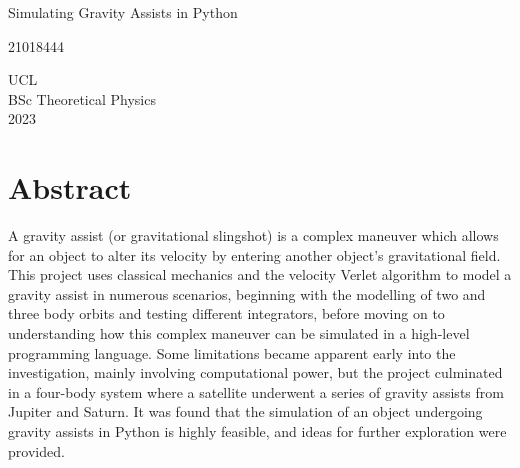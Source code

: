 \documentclass[11pt, english]{report}
\begin{document}
\begin{titlepage}

   \begin{center}
       \vspace*{3cm}
       {Simulating Gravity Assists in Python}
 
       \vspace{4cm}
 
       {21018444}\\
       
       \vspace*{10cm}
      
       
      UCL\\
      
      BSc Theoretical Physics\\
      
      2023
      
 
   \end{center}
\end{titlepage}

\setcounter{page}{2}
\noindent 
\chapter*{\huge{\textbf{Abstract}}}
\normalsize{\noindent A gravity assist (or gravitational slingshot) is a complex maneuver which allows for an object to alter its velocity by entering another object's gravitational field. This project uses classical mechanics and the velocity Verlet algorithm to model a gravity assist in numerous scenarios, beginning with the modelling of two and three body orbits and testing different integrators, before moving on to understanding how this complex maneuver can be simulated in a high-level programming language. Some limitations became apparent early into the investigation, mainly involving computational power, but the project culminated in a four-body system where a satellite underwent a series of gravity assists from Jupiter and Saturn. It was found that the simulation of an object undergoing gravity assists in Python is highly feasible, and ideas for further exploration were provided.}
%


%


\setlength{\cftbeforetoctitleskip}{-22pt}
\setlength{\cftaftertoctitleskip}{-22pt}
\renewcommand{\contentsname}{\huge\textbf{Table of Contents}}
\renewcommand{\cfttoctitlefont}{\chapter*}
\end{document}
